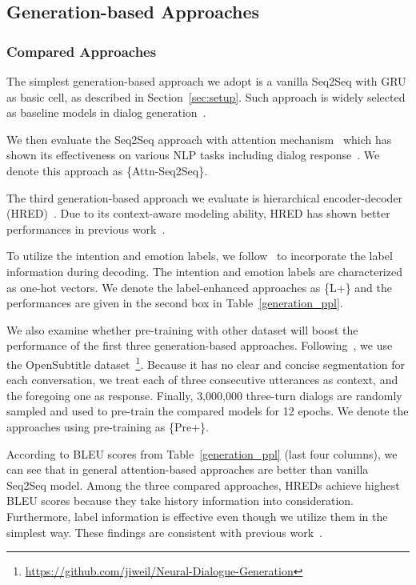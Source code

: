 \documentclass[11pt,letterpaper]{article}
\begin{document}
\subsection{Generation-based Approaches}
\subsubsection{Compared Approaches}
 The simplest generation-based approach we adopt is a vanilla Seq2Seq with GRU as basic cell, as described in Section~\ref{sec:setup}. Such approach is widely selected as baseline models in dialog generation~\citet{Shang2015NeuralRM,ubuntu,reddit}.

 We then evaluate the Seq2Seq approach with attention mechanism~\cite{attention} which has shown its effectiveness on various NLP tasks including dialog response~\cite{teaching,Luong2015EffectiveAT,Mei2017CoherentDW}. We denote this approach as \{Attn-Seq2Seq\}.

 The third generation-based approach we evaluate is hierarchical encoder-decoder (HRED)~\cite{hred}. Due to its context-aware modeling ability, HRED has shown better performances in previous work~\cite{hred}.

 To utilize the intention and emotion labels, we follow~\citet{ECM} to incorporate the label information during decoding. The intention and emotion labels are characterized as one-hot vectors. We denote the label-enhanced approaches as \{L+\} and the performances are given in the second box in Table~\ref{generation_ppl}.

 We also examine whether pre-training with other dataset will boost the performance of the first three generation-based approaches. Following~\citet{Li2016DeepRL,li2017adversarial}, we use the OpenSubtitle dataset~\cite{opensubtitles}\footnote{\url{https://github.com/jiweil/Neural-Dialogue-Generation}}. Because it has no clear and concise segmentation for each conversation, we treat each of three consecutive utterances as context, and the foregoing one as response. Finally, 3,000,000 three-turn dialogs are randomly sampled and used to pre-train the compared models for 12 epochs. We denote the approaches using pre-training as \{Pre+\}.

According to BLEU scores from Table~\ref{generation_ppl} (last four columns), we can see that in general attention-based approaches are better than vanilla Seq2Seq model. Among the three compared approaches, HREDs achieve highest BLEU scores because they take history information into consideration. Furthermore, label information is effective even though we utilize them in the simplest way. These findings are consistent with previous work~\cite{hred,vhred}. 
\end{document}
